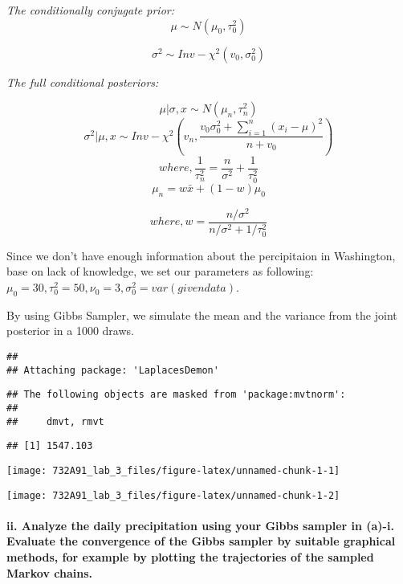 \documentclass[]{article}
\let\oldparagraph\paragraph
\renewcommand{\paragraph}[1]{\oldparagraph{#1}\mbox{}}
\begin{document}
\emph{The conditionally conjugate prior:}
\[\mu \sim N(\mu_0, \tau_0^2)\]

\[\sigma^2 \sim Inv - \chi^2(v_0,\sigma_0^2)\]

\emph{The full conditional posteriors:}

\[\mu|\sigma,x \sim N(\mu_n, \tau_n^2)\]
\[\sigma^2|\mu,x\sim Inv - \chi^2(v_n, \frac{v_0\sigma^2_0+ \sum^n_{i=1}(x_i-\mu)^2}{n+v_0})\]
\[where, \frac{1}{\tau_n^2} = \frac{n}{\sigma^2}+\frac{1}{\tau_0^2}\]
\[\mu_n = w \bar x+(1-w)\mu_0\]

\[where, w = \frac{n/\sigma^2}{ n/\sigma^2 + 1/\tau^2_0}\]

Since we don't have enough information about the percipitaion in
Washington, base on lack of knowledge, we set our parameters as
following:
\(\mu_0=30, \tau_0^2 = 50, \nu_0 = 3, \sigma^2_0 = var(given data)\).

By using Gibbs Sampler, we simulate the mean and the variance from the
joint posterior in a 1000 draws.

\begin{verbatim}
## 
## Attaching package: 'LaplacesDemon'
\end{verbatim}

\begin{verbatim}
## The following objects are masked from 'package:mvtnorm':
## 
##     dmvt, rmvt
\end{verbatim}

\begin{verbatim}
## [1] 1547.103
\end{verbatim}

\begin{center}\texttt{[image: 732A91\_lab\_3\_files/figure-latex/unnamed-chunk-1-1]} \end{center}

\begin{center}\texttt{[image: 732A91\_lab\_3\_files/figure-latex/unnamed-chunk-1-2]} \end{center}

\hypertarget{ii.-analyze-the-daily-precipitation-using-your-gibbs-sampler-in-a-i.-evaluate-the-convergence-of-the-gibbs-sampler-by-suitable-graphical-methods-for-example-by-plotting-the-trajectories-of-the-sampled-markov-chains.}{%
\paragraph{ii. Analyze the daily precipitation using your Gibbs sampler
in (a)-i. Evaluate the convergence of the Gibbs sampler by suitable
graphical methods, for example by plotting the trajectories of the
sampled Markov
chains.}\label{ii.-analyze-the-daily-precipitation-using-your-gibbs-sampler-in-a-i.-evaluate-the-convergence-of-the-gibbs-sampler-by-suitable-graphical-methods-for-example-by-plotting-the-trajectories-of-the-sampled-markov-chains.}}
\end{document}
